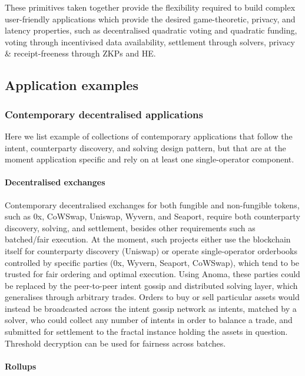 \documentclass[
    9pt,            %
    commun,        %
    affiltop,       %
]{art}
\begin{document}
These primitives taken together provide the flexibility required to
build complex user-friendly applications which provide the desired
game-theoretic, privacy, and latency properties, such as decentralised
quadratic voting and quadratic funding, voting through incentivised data
availability, settlement through solvers, privacy \& receipt-freeness
through ZKPs and HE.

\subsection{Application examples}\label{application-examples}

\subsubsection{Contemporary decentralised
applications}\label{contemporary-decentralised-applications}

Here we list example of collections of contemporary applications that
follow the intent, counterparty discovery, and solving design pattern,
but that are at the moment application specific and rely on at least one
single-operator component.

\paragraph{Decentralised exchanges}\label{decentralised-exchanges}

Contemporary decentralised exchanges for both fungible and non-fungible
tokens, such as 0x, CoWSwap, Uniswap, Wyvern, and Seaport, require both
counterparty discovery, solving, and settlement, besides other
requirements such as batched/fair execution. At the moment, such
projects either use the blockchain itself for counterparty discovery
(Uniswap) or operate single-operator orderbooks controlled by specific
parties (0x, Wyvern, Seaport, CoWSwap), which tend to be trusted for
fair ordering and optimal execution. Using Anoma, these parties could be
replaced by the peer-to-peer intent gossip and distributed solving
layer, which generalises through arbitrary trades. Orders to buy or sell
particular assets would instead be broadcasted across the intent gossip
network as intents, matched by a solver, who could collect any number of
intents in order to balance a trade, and submitted for settlement to the
fractal instance holding the assets in question. Threshold decryption
can be used for fairness across batches.

\paragraph{Rollups}\label{rollups}
\end{document}
